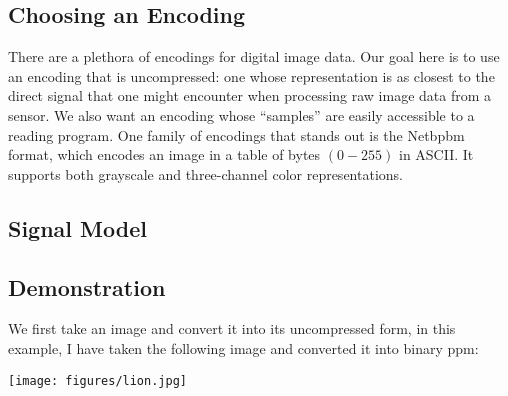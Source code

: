 \documentclass[12pt,technote]{IEEEtran}
\begin{document}
\subsection{Choosing an Encoding}
There are a plethora of encodings for digital image data. Our goal here is to use an encoding that is uncompressed: one whose representation is as closest to the direct signal that one might encounter when processing raw image data from a sensor. We also want an encoding whose ``samples'' are easily accessible to a reading program. %
One family of encodings that stands out is the Netbpbm format, which encodes an image in a table of bytes $(0-255)$ in ASCII. It supports both grayscale and three-channel color representations.

\subsection{Signal Model}

\subsection{}
\subsection{Demonstration}
We first take an image and convert it into its uncompressed form, in this example, I have taken the following image and converted it into binary ppm:
\begin{center}
    \texttt{[image: figures/lion.jpg]}
\end{center}


\end{document}
